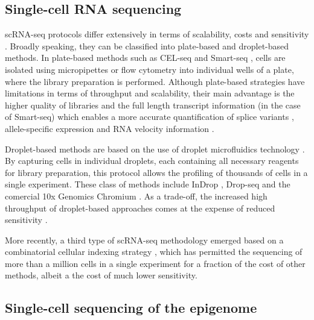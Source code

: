 \subsection{Single-cell RNA sequencing} \label{section:rna_expresssion}

scRNA-seq protocols differ extensively in terms of scalability, costs and sensitivity \cite{Svensson2018, Lafzi2018}. Broadly speaking, they can be classified into plate-based and droplet-based methods. In plate-based methods such as CEL-seq \cite{Hashimshony2012} and Smart-seq \cite{Ramskold2012, Picelli2014}, cells are isolated using micropipettes or flow cytometry into individual wells of a plate, where the library preparation is performed. Although plate-based strategies have limitations in terms of throughput and scalability, their main advantage is the higher quality of libraries and the full length transcript information (in the case of Smart-seq) which enables a more accurate quantification of splice variants \cite{Huang2017}, allele-specific expression \cite{Deng2014} and RNA velocity information \cite{LaManno2018}.
	
Droplet-based methods are based on the use of droplet microfluidics technology \cite{Zhang2019}. By capturing cells in individual droplets, each containing all necessary reagents for library preparation, this protocol allows the profiling of thousands of cells in a single experiment. These class of methods include InDrop \cite{Klein2015,Zilionis2016}, Drop-seq \cite{Macosko2015} and the comercial 10x Genomics Chromium \cite{Zheng2017}. As a trade-off, the increased high throughput of droplet-based approaches comes at the expense of reduced sensitivity \cite{Ziegenhain2017,Wang2019a,Svensson2017}.

More recently, a third type of scRNA-seq methodology emerged based on a combinatorial cellular indexing strategy \cite{Cao2017,Rosenberg2018,Cao2019}, which has permitted the sequencing of more than a million cells in a single experiment for a fraction of the cost of other methods, albeit a the cost of much lower sensitivity.

\subsection{Single-cell sequencing of the epigenome}

